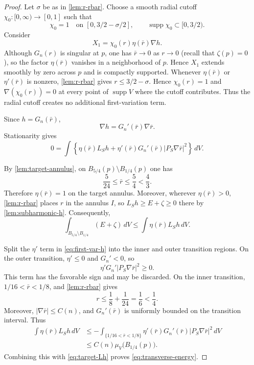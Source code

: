 \documentclass[11pt,reqno]{amsart}
\numberwithin{equation}{section}
\theoremstyle{definition}
\theoremstyle{remark}
\newcommand{\supp}{\operatorname{supp}}
\begin{document}
\begin{proof}
Let $\sigma$ be as in \cref{lem:r-rbar}.  Choose a smooth radial
cutoff $\chi_0:[0,\infty)\to[0,1]$ such that
\[
 \chi_0=1\quad\text{on }[0,3/2-\sigma/2],
 \qquad
 \supp\chi_0\subset[0,3/2).
\]
Consider
\begin{equation}\label{eq:X1}
 X_1=\chi_0(r)\eta(\bar r)\nabla h.
\end{equation}
Although $G_n(r)$ is singular at $p$, one has $\bar r\to0$ as $r\to0$
(recall that $\zeta(p)=0$), so the factor $\eta(\bar r)$ vanishes in a
neighborhood of $p$.  Hence $X_1$ extends smoothly by zero across $p$ and
is compactly supported.  Whenever $\eta(\bar r)$ or
$\eta'(\bar r)$ is nonzero, \cref{lem:r-rbar} gives
$r\le3/2-\sigma$.  Hence $\chi_0(r)=1$ and
$\nabla(\chi_0(r))=0$ at every point of
$\supp V$ where the cutoff contributes.  Thus the radial cutoff creates no
additional first-variation term.

Since $h=G_n(\bar r)$,
\[
 \nabla h=G_n'(\bar r)\nabla\bar r.
\]
Stationarity gives
\begin{equation}\label{eq:first-var-h}
 0=\int\left\{
 \eta(\bar r)L_Sh
 +\eta'(\bar r)G_n'(\bar r)|P_S\nabla\bar r|^2
 \right\}\,dV.
\end{equation}

By \cref{lem:target-annulus}, on $B_{5/4}(p)\setminus B_{1/4}(p)$ one has
\[
 \frac5{24}\le\bar r\le\frac54<\frac43.
\]
Therefore $\eta(\bar r)=1$ on the target annulus.  Moreover, wherever
$\eta(\bar r)>0$, \cref{lem:r-rbar} places $r$ in the annulus $I$, so
$L_Sh\ge E+\zeta\ge0$ there by \cref{lem:subharmonic-h}.  Consequently,
\begin{equation}\label{eq:target-Lh}
 \int_{B_{5/4}\setminus B_{1/4}}(E+\zeta)\,dV
 \le\int\eta(\bar r)L_Sh\,dV.
\end{equation}

Split the $\eta'$ term in \eqref{eq:first-var-h} into the inner and outer
transition regions.  On the outer transition, $\eta'\le0$ and $G_n'<0$, so
\[
 \eta'G_n'|P_S\nabla\bar r|^2\ge0.
\]
This term has the favorable sign and may be discarded.  On the inner
transition, $1/16<\bar r<1/8$, and \cref{lem:r-rbar} gives
\[
 r\le\frac18+\frac1{24}=\frac16<\frac14.
\]
Moreover, $|\nabla\bar r|\le C(n)$, and $G_n'(\bar r)$ is uniformly bounded
on the transition interval.  Thus
\begin{align*}
 \int\eta(\bar r)L_Sh\,dV
 &\le-\int_{\{1/16<\bar r<1/8\}}
 \eta'(\bar r)G_n'(\bar r)|P_S\nabla\bar r|^2\,dV\\
 &\le C(n)\mu_V\bigl(B_{1/4}(p)\bigr).
\end{align*}
Combining this with \eqref{eq:target-Lh} proves \eqref{eq:transverse-energy}.
\end{proof}
\end{document}
